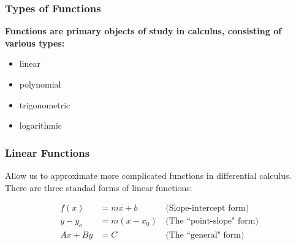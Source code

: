\documentclass{beamer}
\begin{document}
\begin{frame}[fragile]\frametitle{Types of Functions}

\vfill
\begin{center}\textbf{Functions are primary objects of study in calculus, consisting of various types:} \end{center}

\vfill
\begin{itemize}
\item linear
\item polynomial
\item trigonometric
\item logarithmic
\end{itemize}

\end{frame}

\begin{frame}[fragile]\frametitle{Linear Functions}

\vfill
Allow us to approximate more complicated functions in differential calculus. There are three standad forms of linear functions:

\vfill
\begin{align*}
  f(x) &= mx + b &\,\text{(Slope-intercept form)} \\
  y - y_o &= m(x - x_0) &\, \text{(The ``point-slope" form)} \\
  Ax + By &= C &\, \text{(The ``general" form)}
\end{align*}

\end{frame}
\end{document}
